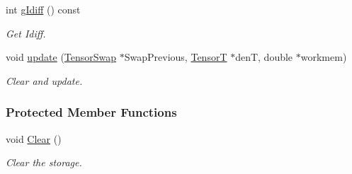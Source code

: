 \begin{DoxyCompactItemize}
int \hyperlink{classCheMPS2_1_1TensorSwap_a3c37c2c8870974ebf9c8fba1f9ac5c72}{g\-Idiff} () const 
\begin{DoxyCompactList}\small\item\em Get Idiff. \end{DoxyCompactList}\item 
void \hyperlink{classCheMPS2_1_1TensorSwap_ad1f0d9f31bd33206db64ae0bb429bfe9}{update} (\hyperlink{classCheMPS2_1_1TensorSwap}{Tensor\-Swap} $\ast$Swap\-Previous, \hyperlink{classCheMPS2_1_1TensorT}{Tensor\-T} $\ast$den\-T, double $\ast$workmem)
\begin{DoxyCompactList}\small\item\em Clear and update. \end{DoxyCompactList}\end{DoxyCompactItemize}
\subsubsection*{Protected Member Functions}
\begin{DoxyCompactItemize}
\item 
\hypertarget{classCheMPS2_1_1TensorSwap_ae853d491b1fe458317879ccf2fd95ae5}{void \hyperlink{classCheMPS2_1_1TensorSwap_ae853d491b1fe458317879ccf2fd95ae5}{Clear} ()}\label{classCheMPS2_1_1TensorSwap_ae853d491b1fe458317879ccf2fd95ae5}

\begin{DoxyCompactList}\small\item\em Clear the storage. \end{DoxyCompactList}\end{DoxyCompactItemize}
